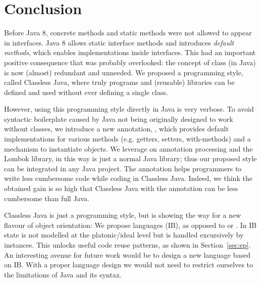 \section{Conclusion}\label{sec:conclusion}

Before Java 8, concrete methods and static methods were not allowed
to appear in interfaces.  Java 8 allows static interface methods and
introduces \emph{default methods}, which enables implementations
inside interfaces. This had an important positive consequence that
was probably overlooked: the concept of class
(in Java) is now (almost) redundant and unneeded.
We proposed a programming style, called Classless Java, where
truly \objectoriented programs and (reusable) libraries
can be defined and used without ever defining a single class.

However, using this programming style directly in Java is very verbose.
To avoid syntactic boilerplate
caused by Java not being originally designed to work without classes,
we introduce a new annotation, \mixin, which provides default implementations
for various methods (e.g. getters, setters, with-methods) and a
mechanism to instantiate objects.
We leverage on annotation processing and the Lombok library, in this way
\mixin is just a normal Java library; thus our proposed style can be integrated
in any Java project.
The \mixin annotation helps programmers
to write less cumbersome code while coding in Classless Java. Indeed,
we think the obtained gain is so high that Classless Java with the \mixin
annotation can be less cumbersome than full Java.

Classless Java is just a programming style, but is showing the way
for a new flavour of object orientation: We propose \interfacebased
\objectoriented languages (IB), as opposed to \classbased or
\prototypebased.  In IB state is not modelled at the platonic/ideal
level but is handled excursively by instances.  This unlocks useful
code reuse patterns, as shown in Section~\ref{sec:ep}.
An interesting avenue for future work would be to design a new
language based on IB. With a proper language design we would not need
to restrict ourselves to the limitations of Java and its syntax.



